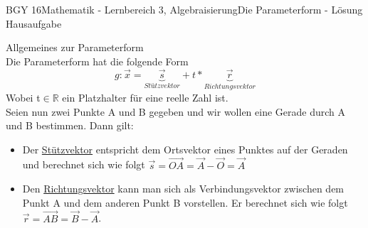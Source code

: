 \documentclass[oneside,openany,headings=optiontotoc,11pt,numbers=noenddot]{scrreprt}
\begin{document}
	\begin{worksheet}{BGY 16}{Mathematik - Lernbereich 3, Algebraisierung}{Die Parameterform - Lösung Hausaufgabe}
		
		\begin{framed}
			\noindent
			\tiny{\color{codegray}Allgemeines zur Parameterform}\\
			\normalsize
			Die Parameterform hat die folgende Form \[g: \vec{x} = \underbrace{\vec{s}}_{Stützvektor} + t*\underbrace{\vec{r}}_{Richtungsvektor}\] Wobei t\(\in \mathbb{R}\) ein Platzhalter für eine reelle Zahl ist.\\
			Seien nun zwei Punkte A und B gegeben und wir wollen eine Gerade durch A und B bestimmen. Dann gilt:
			\begin{itemize}
				\item[] Der \underline{Stützvektor} entspricht dem Ortsvektor eines Punktes auf der Geraden und berechnet sich wie folgt \(\vec{s} = \overrightarrow{OA} = \vec{A} - \vec{O} = \vec{A}\)
				\item[] Den \underline{Richtungsvektor} kann man sich als Verbindungsvektor zwischen dem Punkt A und dem anderen Punkt B vorstellen. Er berechnet sich wie folgt \(\vec{r} = \overrightarrow{AB} = \vec{B} - \vec{A}\).
			\end{itemize}
		\end{framed}
		

\end{worksheet}
\end{document}
